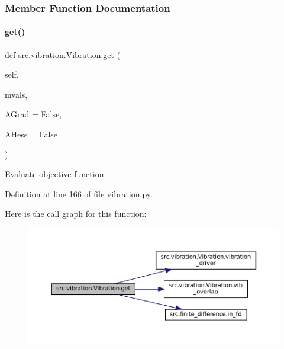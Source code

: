 \subsubsection{Member Function Documentation}
\mbox{\label{classsrc_1_1vibration_1_1Vibration_a362a0f5c538ba08e63234019fdec3057}} 
\paragraph{\texorpdfstring{get()}{get()}}
{\footnotesize\ttfamily def src.\+vibration.\+Vibration.\+get (\begin{DoxyParamCaption}\item[{}]{self,  }\item[{}]{mvals,  }\item[{}]{A\+Grad = {\ttfamily False},  }\item[{}]{A\+Hess = {\ttfamily False} }\end{DoxyParamCaption})}



Evaluate objective function. 



Definition at line 166 of file vibration.\+py.

Here is the call graph for this function\+:
\nopagebreak
\begin{figure}[H]
\begin{center}
\leavevmode
\includegraphics[width=350pt]{classsrc_1_1vibration_1_1Vibration_a362a0f5c538ba08e63234019fdec3057_cgraph}
\end{center}
\end{figure}
\mbox{\label{classsrc_1_1vibration_1_1Vibration_a3d6d6f59937c5be9abc1455a9a9ca359}} 

